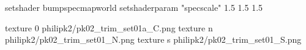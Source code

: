 setshader bumpspecmapworld
setshaderparam "specscale" 1.5 1.5 1.5

texture 0 philipk2/pk02_trim_set01a_C.png
texture n philipk2/pk02_trim_set01_N.png
texture s philipk2/pk02_trim_set01_S.png

